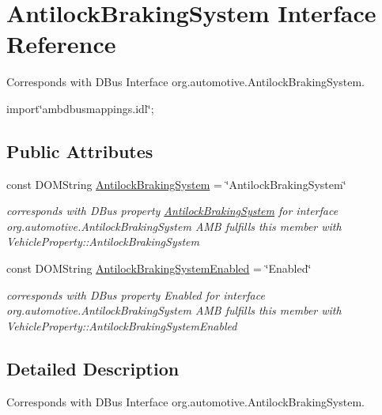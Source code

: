 \hypertarget{interfaceAntilockBrakingSystem}{\section{Antilock\+Braking\+System Interface Reference}
\label{interfaceAntilockBrakingSystem}
}


Corresponds with D\+Bus Interface org.\+automotive.\+Antilock\+Braking\+System.  




{\ttfamily import\char`\"{}ambdbusmappings.\+idl\char`\"{};}

\subsection*{Public Attributes}
\begin{DoxyCompactItemize}
\item 
const D\+O\+M\+String \hyperlink{interfaceAntilockBrakingSystem_ac981fc778ed33a1628e5702244449ec4}{Antilock\+Braking\+System} = \char`\"{}Antilock\+Braking\+System\char`\"{}
\begin{DoxyCompactList}\small\item\em corresponds with D\+Bus property \hyperlink{interfaceAntilockBrakingSystem}{Antilock\+Braking\+System} for interface org.\+automotive.\+Antilock\+Braking\+System A\+M\+B fulfills this member with Vehicle\+Property\+::\+Antilock\+Braking\+System \end{DoxyCompactList}\item 
\hypertarget{interfaceAntilockBrakingSystem_af74f3f8205486fcc486715b924a8ab57}{const D\+O\+M\+String \hyperlink{interfaceAntilockBrakingSystem_af74f3f8205486fcc486715b924a8ab57}{Antilock\+Braking\+System\+Enabled} = \char`\"{}Enabled\char`\"{}}\label{interfaceAntilockBrakingSystem_af74f3f8205486fcc486715b924a8ab57}

\begin{DoxyCompactList}\small\item\em corresponds with D\+Bus property Enabled for interface org.\+automotive.\+Antilock\+Braking\+System A\+M\+B fulfills this member with Vehicle\+Property\+::\+Antilock\+Braking\+System\+Enabled \end{DoxyCompactList}\end{DoxyCompactItemize}


\subsection{Detailed Description}
Corresponds with D\+Bus Interface org.\+automotive.\+Antilock\+Braking\+System. 

